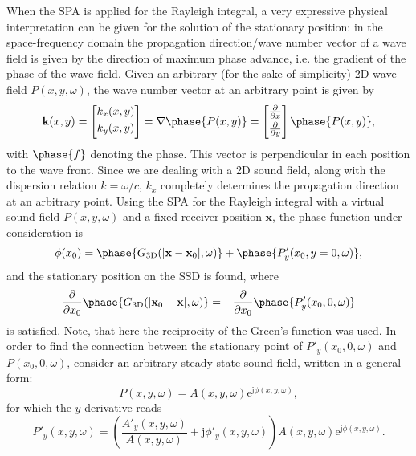 \documentclass[12pt,a4paper]{article}
\newcommand{\te}{\mathrm{e}}
\newcommand{\ti}{\mathrm{j}}
\newcommand{\vx}{\mathbf{x}}
\newcommand{\vxo}{\mathbf{x}_0}
\begin{document}
When the SPA is applied for the Rayleigh integral, a very expressive physical interpretation can be given for the solution of the stationary position:
in the space-frequency domain the propagation direction/wave number vector of a wave field is given by the direction of maximum phase advance, i.e. the gradient of the phase of the wave field. Given an arbitrary (for the sake of simplicity) 2D wave field $P(x,y,\omega)$, the wave number vector at an arbitrary point is given by
\begin{equation}
\mathbf{k}(x,y) = \begin{bmatrix} k_x(x,y) \\[0.3em] k_y(x,y)\\[0.3em]    \end{bmatrix} = \nabla \phase{P(x,y)} = \begin{bmatrix} \frac{\partial}{\partial x} \\[0.3em] \frac{\partial}{\partial y}\\[0.3em] \end{bmatrix}   \phase{P(x,y)},
\end{equation}
with $\phase{f}$ denoting the phase.
This vector is perpendicular in each position to the wave front.
Since we are dealing with a 2D sound field, along with the dispersion relation $k = \omega/c$, $k_x$ completely determines the propagation direction at an arbitrary point.
Using the SPA for the Rayleigh integral with a virtual sound field $P(x,y,\omega)$ and a fixed receiver position $\vx$, the phase function under consideration is 
\begin{equation}
\phi(x_0) =  \phase{G_{\mathrm{3D}}(|\vx-\vxo|,\omega)} + \phase{ P'_y(x_0,y=0,\omega)},
\end{equation}
and the stationary position on the SSD is found, where 
\begin{equation}
\frac{ \partial }{\partial x_0} \phase{G_{\mathrm{3D}}(|\vxo-\vx|,\omega)} = - \frac{ \partial }{\partial x_0} \phase{ P'_y(x_0,0,\omega) }
\end{equation}
is satisfied. Note, that here the reciprocity of the Green's function was used. In order to find the connection between the stationary point of $P'_y(x_0,0,\omega)$ and $P(x_0,0,\omega)$, consider an arbitrary steady state sound field, written in a general form:
\begin{equation}
P(x,y,\omega) = A(x,y,\omega)\te^{\ti \phi(x,y,\omega)},
\end{equation}
for which the $y$-derivative reads
\begin{equation}
P'_y(x,y,\omega) = \left( \frac{A'_y(x,y,\omega)}{A(x,y,\omega)} + \ti \phi'_y(x,y,\omega) \right) A(x,y,\omega)\te^{\ti \phi(x,y,\omega)}.
\end{equation}
\end{document}
